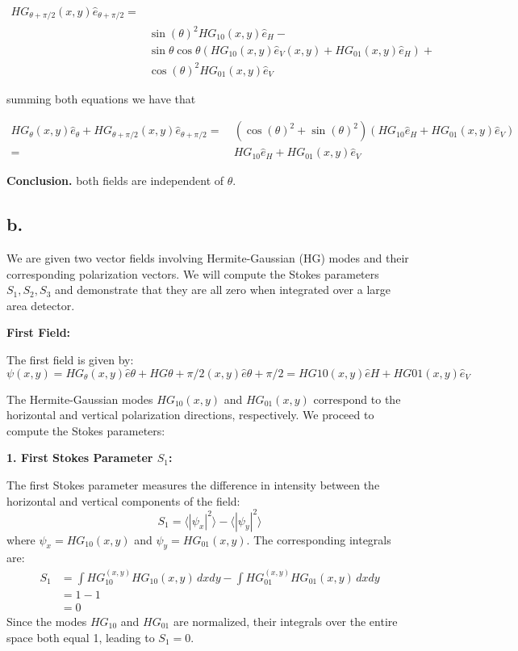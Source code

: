 \documentclass[12pt]{article}
\begin{document}
\begin{flushleft}
     \begin{align*}
         HG_{\theta+\pi/2}(x,y)\hat{e}_{\theta+\pi/2}=&\\
            &\sin(\theta)^2HG_{10}(x,y)\hat{e}_{H} -\\
            &\sin{\theta}\cos{\theta}(HG_{10}(x,y)\hat{e}_{V}(x,y)+HG_{01}(x,y)\hat{e}_{H})+\\
            &\cos(\theta)^2HG_{01}(x,y)\hat{e}_{V}
    \end{align*}

    summing both equations we have that

    \begin{align*}
         HG_{\theta}(x,y)\hat{e}_{\theta}+HG_{\theta+\pi/2}(x,y)\hat{e}_{\theta+\pi/2}=&\ (\cos(\theta)^2+\sin(\theta)^2)(HG_{10}\hat{e}_{H}+HG_{01}(x,y)\hat{e}_{V})\\
         =&\ HG_{10}\hat{e}_{H}+HG_{01}(x,y)\hat{e}_{V}
    \end{align*}

\textbf{Conclusion.} both fields are independent of $\theta$.

\subsection*{b.} We are given two vector fields involving Hermite-Gaussian (HG) modes and their corresponding polarization vectors. We will compute the Stokes parameters \( S_1, S_2, S_3 \) and demonstrate that they are all zero when integrated over a large area detector.

\textbf{First Field:}

The first field is given by:
\[
\psi(x,y) = HG_{\theta}(x, y) \hat{e}{\theta} + HG{\theta + \pi/2}(x, y) \hat{e}{\theta + \pi/2} = HG{10}(x, y) \hat{e}H + HG{01}(x, y) \hat{e}_V
\]

The Hermite-Gaussian modes \( HG_{10}(x, y) \) and \( HG_{01}(x, y) \) correspond to the horizontal and vertical polarization directions, respectively. We proceed to compute the Stokes parameters:

\textbf{1. First Stokes Parameter \( S_1 \):}

The first Stokes parameter measures the difference in intensity between the horizontal and vertical components of the field:
\[
S_1 = \langle |\psi_x|^2 \rangle - \langle |\psi_y|^2 \rangle
\]
where \( \psi_x = HG_{10}(x, y) \) and \( \psi_y = HG_{01}(x, y) \). The corresponding integrals are:
\begin{equation}
    \begin{split}
    S_1 &= \int HG_{10}^(x, y) HG_{10}(x, y) \, dxdy - \int HG_{01}^(x, y) HG_{01}(x, y) \, dxdy \\
    &= 1 - 1 \\
    &= 0
    \end{split}
\end{equation}
Since the modes \( HG_{10} \) and \( HG_{01} \) are normalized, their integrals over the entire space both equal 1, leading to \( S_1 = 0 \).


\end{flushleft}
\end{document}
